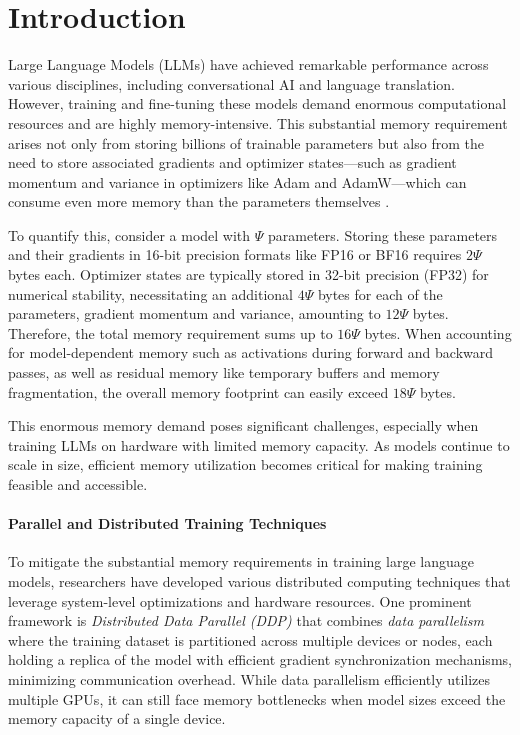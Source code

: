 
\vspace{-8mm}
\section{Introduction}
Large Language Models (LLMs) have achieved remarkable performance across various disciplines, including conversational AI and language translation. However, training and fine-tuning these models demand enormous computational resources and are highly memory-intensive. This substantial memory requirement arises not only from storing billions of trainable parameters but also from the need to store associated gradients and optimizer states—such as gradient momentum and variance in optimizers like Adam and AdamW—which can consume even more memory than the parameters themselves \citep{raffelExploringLimitsTransfer2020,touvronLlamaOpenFoundation2023,chowdheryPaLMScalingLanguage2022}.

To quantify this, consider a model with $\Psi$ parameters. Storing these parameters and their gradients in 16-bit precision formats like FP16 or BF16 requires $2\Psi$ bytes each. Optimizer states are typically stored in 32-bit precision (FP32) for numerical stability, necessitating an additional $4\Psi$ bytes for each of the parameters, gradient momentum and variance, amounting to $12\Psi$ bytes. Therefore, the total memory requirement sums up to $16\Psi$ bytes. When accounting for model-dependent memory such as activations during forward and backward passes, as well as residual memory like temporary buffers and memory fragmentation, the overall memory footprint can easily exceed $18\Psi$ bytes.

This enormous memory demand poses significant challenges, especially when training LLMs on hardware with limited memory capacity. As models continue to scale in size, efficient memory utilization becomes critical for making training feasible and accessible.

\paragraph{Parallel and Distributed Training Techniques}
To mitigate the substantial memory requirements in training large language models, researchers have developed various distributed computing techniques that leverage system-level optimizations and hardware resources. One prominent framework is \textit{Distributed Data Parallel (DDP)} that combines \textit{data parallelism} where the training dataset is partitioned across multiple devices or nodes, each holding a replica of the model with efficient gradient synchronization mechanisms, minimizing communication overhead. While data parallelism efficiently utilizes multiple GPUs, it can still face memory bottlenecks when model sizes exceed the memory capacity of a single device.

